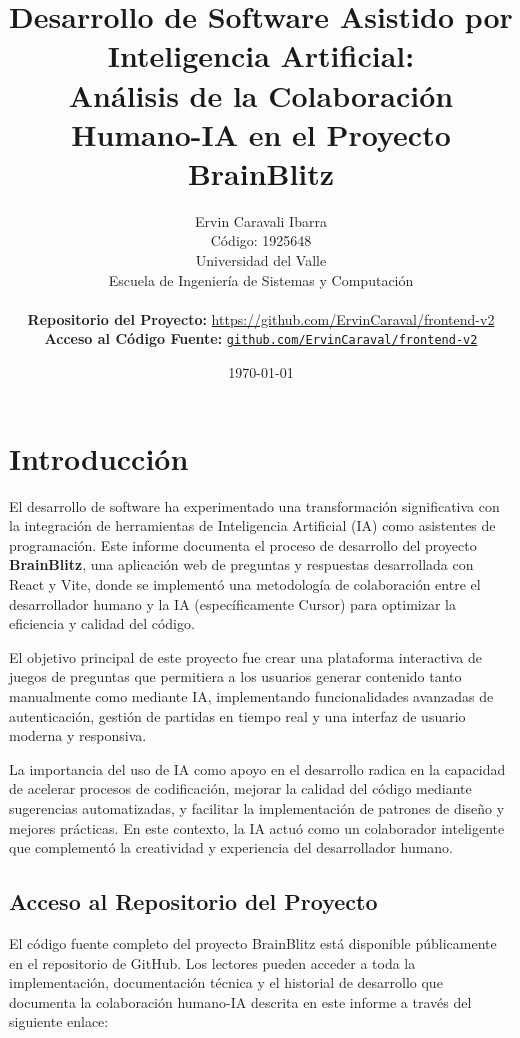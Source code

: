 \documentclass[12pt,a4paper]{article}
\title{\textbf{Desarrollo de Software Asistido por Inteligencia Artificial:\\
Análisis de la Colaboración Humano-IA en el Proyecto BrainBlitz}}
\author{Ervin Caravali Ibarra\\
Código: 1925648\\
Universidad del Valle\\
Escuela de Ingeniería de Sistemas y Computación\\
\\
\textbf{Repositorio del Proyecto:} \url{https://github.com/ErvinCaraval/frontend-v2}\\
\textbf{Acceso al Código Fuente:} \href{https://github.com/ErvinCaraval/frontend-v2}{\texttt{github.com/ErvinCaraval/frontend-v2}}}
\date{\today}
\begin{document}
\maketitle

\newpage

\tableofcontents

\newpage

\section{Introducción}

El desarrollo de software ha experimentado una transformación significativa con la integración de herramientas de Inteligencia Artificial (IA) como asistentes de programación. Este informe documenta el proceso de desarrollo del proyecto \textbf{BrainBlitz}, una aplicación web de preguntas y respuestas desarrollada con React y Vite, donde se implementó una metodología de colaboración entre el desarrollador humano y la IA (específicamente Cursor) para optimizar la eficiencia y calidad del código.

El objetivo principal de este proyecto fue crear una plataforma interactiva de juegos de preguntas que permitiera a los usuarios generar contenido tanto manualmente como mediante IA, implementando funcionalidades avanzadas de autenticación, gestión de partidas en tiempo real y una interfaz de usuario moderna y responsiva.

La importancia del uso de IA como apoyo en el desarrollo radica en la capacidad de acelerar procesos de codificación, mejorar la calidad del código mediante sugerencias automatizadas, y facilitar la implementación de patrones de diseño y mejores prácticas. En este contexto, la IA actuó como un colaborador inteligente que complementó la creatividad y experiencia del desarrollador humano.

\subsection{Acceso al Repositorio del Proyecto}

El código fuente completo del proyecto BrainBlitz está disponible públicamente en el repositorio de GitHub. Los lectores pueden acceder a toda la implementación, documentación técnica y el historial de desarrollo que documenta la colaboración humano-IA descrita en este informe a través del siguiente enlace:

\begin{center}
\end{center}
\end{document}
